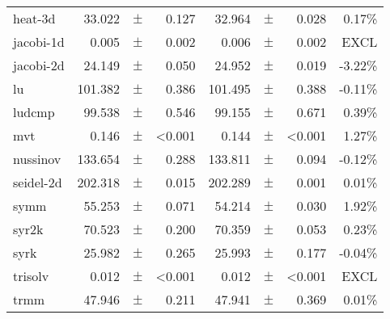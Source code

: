 \begin{table}
{\begin{tabular}{p{1.1cm}rp{0.01cm}rrp{0.01cm}rr}
heat-3d&	33.022&$\pm$&	0.127&	32.964&$\pm$&	0.028& 0.17\%\\\rowcolor{aluminium1}
jacobi-1d&	0.005&$\pm$&	0.002&	0.006&$\pm$&	0.002& EXCL\\
jacobi-2d&	24.149&$\pm$&	0.050&	24.952&$\pm$&	0.019& -3.22\%\\\rowcolor{aluminium1}
lu&	101.382&$\pm$&	0.386&	101.495&$\pm$&	0.388& -0.11\%\\
ludcmp&	99.538&$\pm$&	0.546&	99.155&$\pm$&	0.671& 0.39\%\\\rowcolor{aluminium1}
mvt&	0.146&$\pm$&	<0.001&	0.144&$\pm$&	<0.001& 1.27\%\\
nussinov&	133.654&$\pm$&	0.288&	133.811&$\pm$&	0.094& -0.12\%\\\rowcolor{aluminium1}
seidel-2d&	202.318&$\pm$&	0.015&	202.289&$\pm$&	0.001& 0.01\%\\
symm&	55.253&$\pm$&	0.071&	54.214&$\pm$&	0.030& 1.92\%\\\rowcolor{aluminium1}
syr2k&	70.523&$\pm$&	0.200&	70.359&$\pm$&	0.053& 0.23\%\\
syrk&	25.982&$\pm$&	0.265&	25.993&$\pm$&	0.177& -0.04\%\\\rowcolor{aluminium1}
trisolv&	0.012&$\pm$&	<0.001&	0.012&$\pm$&	<0.001& EXCL\\
trmm&	47.946&$\pm$&	0.211&	47.941&$\pm$&	0.369& 0.01\%\\ \bottomrule
\end{tabular}
}
\end{table}